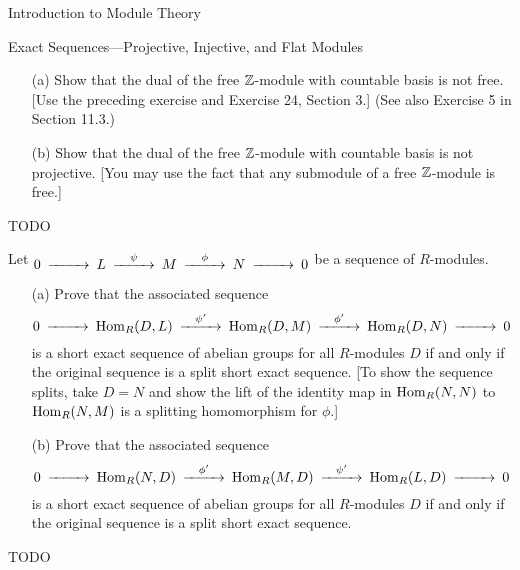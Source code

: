 \begin{chapter}{Introduction to Module Theory}
\begin{section}{Exact Sequences---Projective, Injective, and Flat Modules}
\begin{solution}
\end{solution}\oneperpage



\begin{problem}\label{ex:10.5.13}
\begin{enumerate}
\item[(a)] Show that the dual of the free $\mathbb{Z}$-module with countable basis is not free. [Use the preceding exercise and Exercise 24, Section 3.] (See also Exercise 5 in Section 11.3.)
\item[(b)] Show that the dual of the free $\mathbb{Z}$-module with countable basis is not projective. [You may use the fact that any submodule of a free $\mathbb{Z}$-module is free.]
\end{enumerate}
\end{problem}
\begin{solution}TODO

\end{solution}\oneperpage



\begin{problem}\label{ex:10.5.14}
Let $\begin{CD}0@>>>L@>\psi>>M@>\phi>>N@>>>0\end{CD}$ be a sequence of $R$-modules.
\begin{enumerate}
\item[(a)] Prove that the associated sequence \[
\begin{CD}0@>>>\Hom_R(D,L)@>\psi'>>\Hom_R(D,M)@>\phi'>>\Hom_R(D,N)@>>>0\end{CD}
\]
is a short exact sequence of abelian groups for all $R$-modules $D$ if and only if the original sequence is a split short exact sequence. [To show the sequence splits, take $D=N$ and show the lift of the identity map in $\operatorname{Hom}_R(N,N)$ to $\operatorname{Hom}_R(N,M)$ is a splitting homomorphism for $\phi$.]
\item[(b)] Prove that the associated sequence \[
\begin{CD}0@>>>\Hom_R(N,D)@>\phi'>>\Hom_R(M,D)@>\psi'>>\Hom_R(L,D)@>>>0\end{CD}
\]
is a short exact sequence of abelian groups for all $R$-modules $D$ if and only if the original sequence is a split short exact sequence. 
\end{enumerate}
\end{problem}
\begin{solution}TODO

\end{solution}\oneperpage




\end{section}
\end{chapter}
